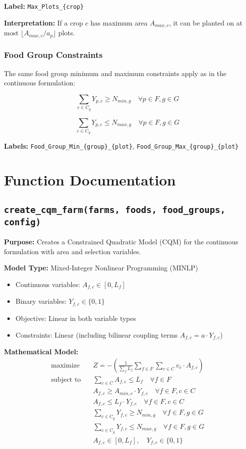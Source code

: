 \documentclass{article}
\begin{document}
\textbf{Label:} \texttt{Max\_Plots\_\{crop\}}

\textbf{Interpretation:} If a crop $c$ has maximum area $A_{max,c}$, it can be planted on at most $\lfloor A_{max,c} / a_p \rfloor$ plots.

\subsubsection{Food Group Constraints}

The same food group minimum and maximum constraints apply as in the continuous formulation:

$$\sum_{c \in C_g} Y_{p,c} \geq N_{min,g} \quad \forall p \in F, g \in G$$

$$\sum_{c \in C_g} Y_{p,c} \leq N_{max,g} \quad \forall p \in F, g \in G$$

\textbf{Labels:} \texttt{Food\_Group\_Min\_\{group\}\_\{plot\}}, \texttt{Food\_Group\_Max\_\{group\}\_\{plot\}}

\section{Function Documentation}

\subsection{\texttt{create\_cqm\_farm(farms, foods, food\_groups, config)}}

\textbf{Purpose:} Creates a Constrained Quadratic Model (CQM) for the continuous formulation with area and selection variables.

\textbf{Model Type:} Mixed-Integer Nonlinear Programming (MINLP)
\begin{itemize}
    \item Continuous variables: $A_{f,c} \in [0, L_f]$
    \item Binary variables: $Y_{f,c} \in \{0,1\}$
    \item Objective: Linear in both variable types
    \item Constraints: Linear (including bilinear coupling terms $A_{f,c} = a \cdot Y_{f,c}$)
\end{itemize}

\textbf{Mathematical Model:}
\begin{align*}
\text{maximize} \quad & Z = -\left(\frac{1}{\sum_{f} L_f} \sum_{f \in F} \sum_{c \in C} v_c \cdot A_{f,c}\right) \\
\text{subject to} \quad & \sum_{c \in C} A_{f,c} \leq L_f \quad \forall f \in F \\
& A_{f,c} \geq A_{min,c} \cdot Y_{f,c} \quad \forall f \in F, c \in C \\
& A_{f,c} \leq L_f \cdot Y_{f,c} \quad \forall f \in F, c \in C \\
& \sum_{c \in C_g} Y_{f,c} \geq N_{min,g} \quad \forall f \in F, g \in G \\
& \sum_{c \in C_g} Y_{f,c} \leq N_{max,g} \quad \forall f \in F, g \in G \\
& A_{f,c} \in [0, L_f], \quad Y_{f,c} \in \{0,1\}
\end{align*}
\end{document}
